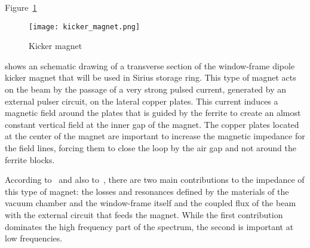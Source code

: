     Figure~\ref{fig:kicker_magnet}
    \begin{figure}[bt]
        \centering
        \texttt{[image: kicker\_magnet.png]}
        \caption{Kicker magnet}
        \label{fig:kicker_magnet}
    \end{figure}
    shows an schematic drawing of a transverse section of the window-frame dipole kicker magnet that will be used in Sirius storage ring. This type of magnet acts on the beam by the passage of a very strong pulsed current, generated by an external pulser circuit, on the lateral copper plates. This current induces a magnetic field around the plates that is guided by the ferrite to create an almost constant vertical field at the inner gap of the magnet. The copper plates located at the center of the magnet are important to increase the magnetic impedance for the field lines, forcing them to close the loop by the air gap and not around the ferrite blocks.

    According to~ and also to~, there are two main contributions to the impedance of this type of magnet: the losses and resonances defined by the materials of the vacuum chamber and the window-frame itself and the coupled flux of the beam with the external circuit that feeds the magnet. While the first contribution dominates the high frequency part of the spectrum, the second is important at low frequencies.

